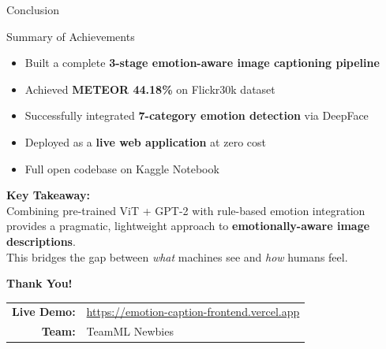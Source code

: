 \documentclass{beamer}
\begin{document}
\begin{frame}{Conclusion}

    \begin{block}{Summary of Achievements}
        \begin{itemize}
            \item Built a complete \textbf{3-stage emotion-aware image captioning pipeline}
            \item Achieved \textbf{METEOR 44.18\%} on Flickr30k dataset
            \item Successfully integrated \textbf{7-category emotion detection} via DeepFace
            \item Deployed as a \textbf{live web application} at zero cost
            \item Full open codebase on Kaggle Notebook
        \end{itemize}
    \end{block}

    \vspace{0.5cm}
    \textbf{Key Takeaway:}\\[0.3em]
    Combining pre-trained ViT + GPT-2 with rule-based emotion integration provides
    a pragmatic, lightweight approach to \textbf{emotionally-aware image descriptions}.\\[0.4em]
    This bridges the gap between \textit{what} machines see and \textit{how} humans feel.

\end{frame}

\begin{frame}
    \centering
    \vspace{1cm}
    {\Huge \textbf{Thank You!}}\\[1cm]
    \begin{tabular}{rl}
    \textbf{Live Demo:} & \url{https://emotion-caption-frontend.vercel.app} \\[0.4em]
    \textbf{Team:}      & TeamML Newbies \\
    \end{tabular}
\end{frame}

\end{document}
